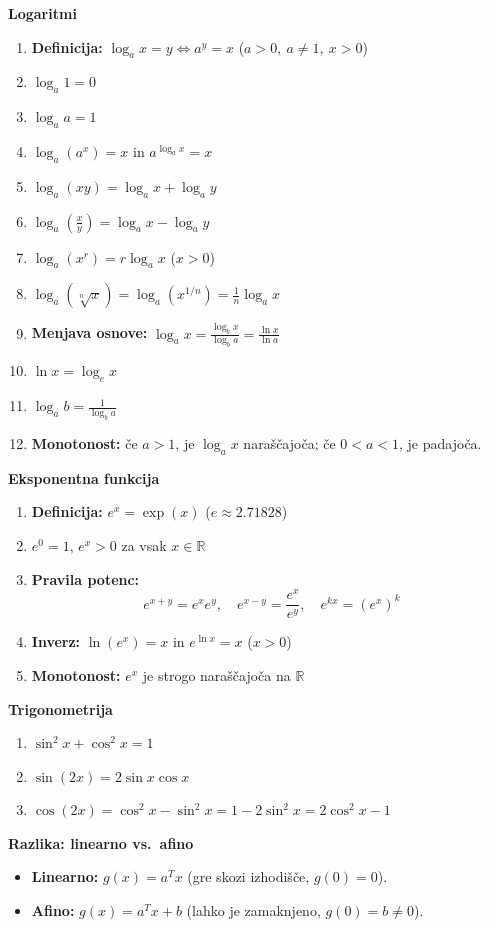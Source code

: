 \textbf{Logaritmi}
\begin{center}
	\begin{small}
		\begin{enumerate}
			\item \textbf{Definicija:} $\log_a x = y \iff a^y = x$ \quad ($a>0,\ a\neq 1,\ x>0$)
			\item $\log_a 1 = 0$
			\item $\log_a a = 1$
			\item $\log_a(a^x)=x$ \quad in \quad $a^{\log_a x}=x$
			\item $\log_a(xy)=\log_a x+\log_a y$
			\item $\log_a\!\left(\frac{x}{y}\right)=\log_a x-\log_a y$
			\item $\log_a(x^r)=r\log_a x$ \quad ($x>0$)
			\item $\log_a\!\left(\sqrt[n]{x}\right)=\log_a\!\left(x^{1/n}\right)=\frac{1}{n}\log_a x$
			\item \textbf{Menjava osnove:} $\log_a x=\frac{\log_b x}{\log_b a}=\frac{\ln x}{\ln a}$
			\item $\ln x = \log_e x$
			\item $\log_a b=\frac{1}{\log_b a}$
			\item \textbf{Monotonost:} če $a>1$, je $\log_a x$ naraščajoča; če $0<a<1$, je padajoča.
		\end{enumerate}
	\end{small}
\end{center}

\textbf{Eksponentna funkcija}
\begin{center}
	\begin{small}
		\begin{enumerate}
			\item \textbf{Definicija:} $e^x = \exp(x)$ \quad ($e \approx 2.71828$)
			\item $e^0 = 1$, \quad $e^x>0$ za vsak $x\in\mathbb{R}$
			\item \textbf{Pravila potenc:}
			      \[
				      e^{x+y}=e^x e^y,\quad e^{x-y}=\frac{e^x}{e^y},\quad e^{kx}=(e^x)^k
			      \]
			\item \textbf{Inverz:} $\ln(e^x)=x$ in $e^{\ln x}=x$ \quad ($x>0$)
			\item \textbf{Monotonost:} $e^x$ je strogo naraščajoča na $\mathbb{R}$
		\end{enumerate}
	\end{small}
\end{center}

\textbf{Trigonometrija}
\begin{center}
	\begin{small}
		\begin{enumerate}
			\item $\sin^2 x+\cos^2 x=1$
			\item $\sin(2x)=2\sin x\cos x$
			\item $\cos(2x)=\cos^2 x-\sin^2 x=1-2\sin^2 x=2\cos^2 x-1$
		\end{enumerate}
	\end{small}
\end{center}

\textbf{Razlika: linearno vs.\ afino}

\begin{itemize}
	\item \textbf{Linearno:} \(g(x)=a^{T}x\) (gre skozi izhodišče, \(g(0)=0\)).
	\item \textbf{Afino:} \(g(x)=a^{T}x+b\) (lahko je zamaknjeno, \(g(0)=b\neq 0\)).
\end{itemize}
